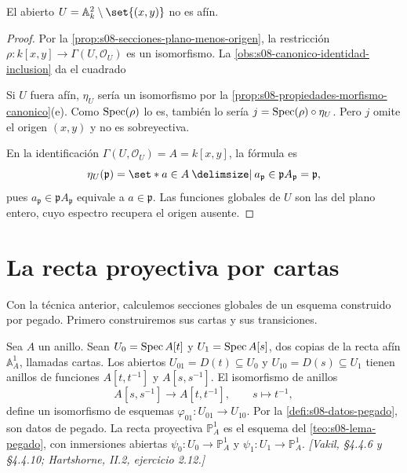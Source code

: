 \begin{coro}
\label{coro:s08-plano-menos-origen-no-afin}
El abierto $U=\mathbb A_k^2\setminus\set{(x,y)}$ no es afín.
\end{coro}
\begin{proof}
Por la \cref{prop:s08-secciones-plano-menos-origen}, la restricción $\rho\colon k[x,y]\to\Gamma(U,\mathcal O_U)$ es un isomorfismo. La \cref{obs:s08-canonico-identidad-inclusion} da el cuadrado
\begin{center}
\end{center}
Si $U$ fuera afín, $\eta_U$ sería un isomorfismo por la \cref{prop:s08-propiedades-morfismo-canonico}(e). Como $\operatorname{Spec}(\rho)$ lo es, también lo sería $j=\operatorname{Spec}(\rho)\circ\eta_U$. Pero $j$ omite el origen $(x,y)$ y no es sobreyectiva.

En la identificación $\Gamma(U,\mathcal O_U)=A=k[x,y]$, la fórmula es
\[
\eta_U(\mathfrak p)
=\set*{a\in A\given a_{\mathfrak p}\in\mathfrak pA_{\mathfrak p}}
=\mathfrak p,
\]
pues $a_{\mathfrak p}\in\mathfrak pA_{\mathfrak p}$ equivale a $a\in\mathfrak p$. Las funciones globales de $U$ son las del plano entero, cuyo espectro recupera el origen ausente.
\end{proof}

\section{La recta proyectiva por cartas}

Con la técnica anterior, calculemos secciones globales de un esquema construido por pegado. Primero construiremos sus cartas y sus transiciones.

\begin{defi}
\label{defi:s08-recta-proyectiva}
Sea $A$ un anillo. Sean $U_0=\operatorname{Spec} A[t]$ y $U_1=\operatorname{Spec} A[s]$, dos copias de la recta afín $\mathbb A_A^1$, llamadas cartas. Los abiertos $U_{01}=D(t)\subseteq U_0$ y $U_{10}=D(s)\subseteq U_1$ tienen anillos de funciones $A[t,t^{-1}]$ y $A[s,s^{-1}]$. El isomorfismo de anillos
\[
A[s,s^{-1}]\longrightarrow A[t,t^{-1}],\qquad s\longmapsto t^{-1},
\]
define un isomorfismo de esquemas $\varphi_{01}\colon U_{01}\to U_{10}$. Por la \cref{defi:s08-datos-pegado}, son datos de pegado. La recta proyectiva $\mathbb P_A^1$ es el esquema del \cref{teo:s08-lema-pegado}, con inmersiones abiertas $\psi_0\colon U_0\to\mathbb P_A^1$ y $\psi_1\colon U_1\to\mathbb P_A^1$. \emph{[Vakil, \S4.4.6 y \S4.4.10; Hartshorne, II.2, ejercicio 2.12.]}
\end{defi}

